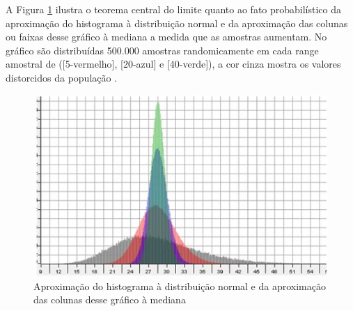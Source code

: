A Figura \ref{fig:statisticsbyjim_central_limit_theorem} ilustra o teorema central do limite quanto ao fato probabilístico da aproximação do histograma à distribuição normal e da aproximação das colunas ou faixas desse gráfico à mediana a medida que as amostras aumentam. No gráfico são distribuídas 500.000 amostras randomicamente em cada range amostral de ([5-vermelho], [20-azul] e [40-verde]), a cor cinza mostra os valores distorcidos da população \cite{statisticsbyjim_central_limite_theorem_explainded}.
	\begin{figure}[H]
	\caption{Aproximação do histograma à distribuição normal e da aproximação das colunas desse gráfico à mediana}
	\label{fig:statisticsbyjim_central_limit_theorem}
	\centering
	\includegraphics[scale=1.2]{sections/images/statisticsbyjim_central_limit_theorem.jpg}
	\end{figure}

